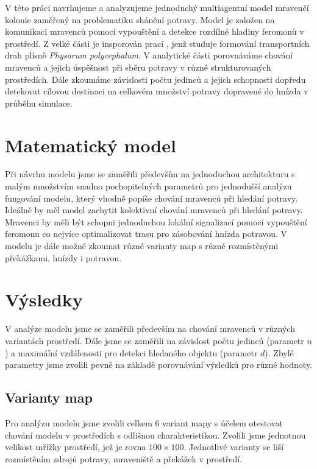 \documentclass[10pt,a4paper,twocolumn]{article}
\begin{document}
V této práci navrhujeme a analyzujeme jednoduchý multiagentní model mravenčí 
kolonie zaměřený na problematiku shánění potravy. Model je založen na komunikaci
mravenců pomocí vypouštění a detekce rozdílné hladiny feromonů v prostředí.
Z velké části je insporován prací \citet{jones2010characteristics}, jenž studuje
formování transportních drah plísně \emph{Physarum polycephalum}. V analytické části
porovnáváme chování mravenců a jejich úspěšnost při sběru potravy v různě 
strukturovaných prostředích. Dále zkoumáme závislosti počtu jedinců a jejich 
schopnosti dopředu detekovat cílovou destinaci na celkovém množství potravy 
dopravené do hnízda v průběhu simulace. 


\section{Matematický model}
Při návrhu modelu jsme se zaměřili především na jednoduchou architekturu s
malým množstvím snadno pochopitelných parametrů pro jednodušší analýzu 
fungování modelu, který vhodně popíše chování mravenců při hledání potravy.
Ideálně by měl model zachytit kolektivní chování mravenců při hledání potravy.
Mravenci by měli být schopni jednoduchou lokální signalizací pomocí
vypouštění feromonu co nejvíce optimalizovat trasu pro zásobování hnízda
potravou. V modelu je dále možné zkoumat různé varianty map s různě 
rozmístěnými překážkami, hnízdy i potravou.

\section{Výsledky}

V analýze modelu jsme se zaměřili především na chování mravenců v různých
variantách prostředí. Dále jsme se zaměřili na závislost počtu
jedinců (parametr $n$) a maximální vzdálenosti pro detekci hledaného 
objektu (parametr $d$). Zbylé parametry jsme zvolili pevně na základě
porovnávání výsledků pro různé hodnoty. 

\subsection{Varianty map}
Pro analýzu modelu jsme zvolili celkem 6 variant mapy s účelem otestovat
chování modelu v prostředích s odlišnou charakteristikou. Zvolili jsme 
jednotnou velikost mřížky prostředí, jež je rovna $100 \times 100$.
Jednotlivé varianty se liší rozmístěním zdrojů potravy, mraveniště a překážek
v prostředí.
\end{document}
